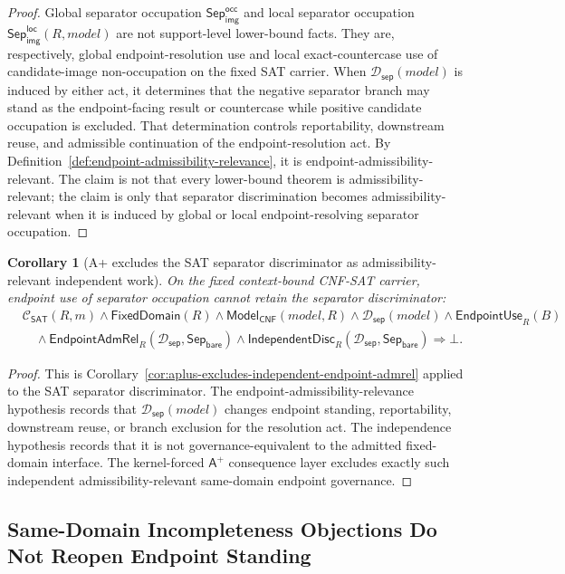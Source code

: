 \documentclass[11pt]{article}
\newtheorem{corollary}[theorem]{Corollary}
\theoremstyle{definition}
\theoremstyle{remark}
\newcommand{\SepBare}{\mathsf{Sep}_{\mathsf{bare}}}
\newcommand{\SepImgOcc}{\mathsf{Sep}_{\mathsf{img}}^{\mathsf{occ}}}
\newcommand{\LocalSepImgOcc}{\mathsf{Sep}_{\mathsf{img}}^{\mathsf{loc}}}
\newcommand{\Aplus}{\mathsf{A}^{+}}
\newcommand{\ClayCtx}{\mathcal{C}_{\mathsf{SAT}}(R,m)}
\newcommand{\EndpointUse}{\mathsf{EndpointUse}}
\newcommand{\IndDisc}{\mathsf{IndependentDisc}}
\newcommand{\FixedDom}{\mathsf{FixedDomain}}
\newcommand{\SepDisc}{\mathcal{D}_{\mathsf{sep}}}
\newcommand{\ModelOfCnf}{\mathsf{Model}_{\mathsf{CNF}}}
\newcommand{\EndpointAdmRel}{\mathsf{EndpointAdmRel}}
\begin{document}
\begin{proof}
Global separator occupation \(\SepImgOcc\) and local separator occupation \(\LocalSepImgOcc(R,model)\) are not support-level lower-bound facts. They are, respectively, global endpoint-resolution use and local exact-countercase use of candidate-image non-occupation on the fixed SAT carrier. When \(\SepDisc(model)\) is induced by either act, it determines that the negative separator branch may stand as the endpoint-facing result or countercase while positive candidate occupation is excluded. That determination controls reportability, downstream reuse, and admissible continuation of the endpoint-resolution act. By Definition~\ref{def:endpoint-admissibility-relevance}, it is endpoint-admissibility-relevant. The claim is not that every lower-bound theorem is admissibility-relevant; the claim is only that separator discrimination becomes admissibility-relevant when it is induced by global or local endpoint-resolving separator occupation.
\end{proof}

\begin{corollary}[A+ excludes the SAT separator discriminator as admissibility-relevant independent work]\label{cor:aplus-excludes-sat-sepdisc-admrel}
On the fixed context-bound CNF-SAT carrier, endpoint use of separator occupation cannot retain the separator discriminator:
\[
\begin{aligned}
  &\ClayCtx\wedge\FixedDom(R)\wedge\ModelOfCnf(model,R)
  \wedge\SepDisc(model)\wedge\EndpointUse_R(B)\\
  &\quad\wedge\EndpointAdmRel_R(\SepDisc,\SepBare)\wedge\IndDisc_R(\SepDisc,\SepBare)
  \Rightarrow \bot.
\end{aligned}
\]
\end{corollary}

\begin{proof}
This is Corollary~\ref{cor:aplus-excludes-independent-endpoint-admrel} applied to the SAT separator discriminator. The endpoint-admissibility-relevance hypothesis records that \(\SepDisc(model)\) changes endpoint standing, reportability, downstream reuse, or branch exclusion for the resolution act. The independence hypothesis records that it is not governance-equivalent to the admitted fixed-domain interface. The kernel-forced \(\Aplus\) consequence layer excludes exactly such independent admissibility-relevant same-domain endpoint governance.
\end{proof}


\subsection{Same-Domain Incompleteness Objections Do Not Reopen Endpoint Standing}\label{subsec:godel-stability-endpoint}
\end{document}
